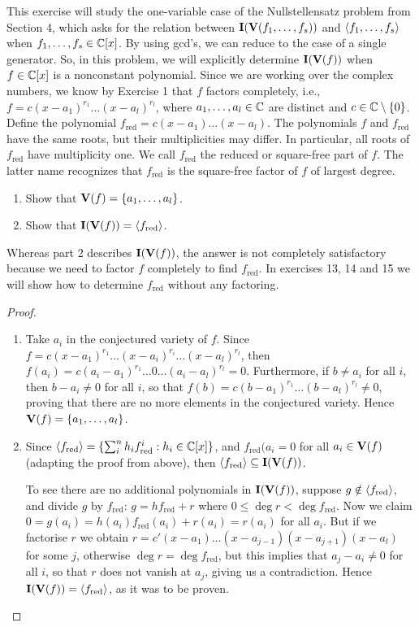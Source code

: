 \begin{exercise}{12}
This exercise will study the one-variable case of the Nullstellensatz problem from Section 4, which asks for the relation between $\mathbf{I}(\mathbf{V}(f_1,\dots,f_s))$ and $\langle f_1,\dots,f_s\rangle$ when $f_1,\dots,f_s\in\mathbb{C}[x]$. By using gcd's, we can reduce to the case of a single generator. So, in this problem, we will explicitly determine $\mathbf{I}(\mathbf{V}(f))$ when $f\in\mathbb{C}[x]$ is a nonconstant polynomial. Since we are working over the complex numbers, we know by Exercise 1 that $f$ factors completely, i.e., $f=c(x-a_1)^{r_1}\dots(x-a_l)^{r_l}$, where $a_1,\dots,a_l\in\mathbb{C}$ are distinct and $c\in\mathbb{C}\setminus\{0\}$. Define the polynomial $f_{\text{red}}=c(x-a_1)\dots(x-a_l)$. The polynomials $f$ and $f_{\text{red}}$ have the same roots, but their multiplicities may differ. In particular, all roots of $f_{\text{red}}$ have multiplicity one. We call $f_{\text{red}}$ the reduced or square-free part of $f$. The latter name recognizes that $f_{\text{red}}$ is the square-free factor of $f$ of largest degree.
\begin{enumerate}
    \item Show that $\mathbf{V}(f)=\{a_1,\dots,a_l\}$.
    \item Show that $\mathbf{I}(\mathbf{V}(f))=\langle f_{\text{red}}\rangle$.
\end{enumerate}
Whereas part 2 describes $\mathbf{I}(\mathbf{V}(f))$, the answer is not completely satisfactory because we need to factor $f$ completely to find $f_{\text{red}}$. In exercises 13, 14 and 15 we will show how to determine $f_{\text{red}}$ without any factoring.
\end{exercise}
\begin{proof}
\begin{enumerate}
    \item Take $a_i$ in the conjectured variety of $f$. Since $f=c(x-a_1)^{r_1}\dots(x-a_i)^{r_i}\dots(x-a_l)^{r_l}$, then $f(a_i)=c(a_i-a_1)^{r_1}\dots 0\dots(a_i-a_l)^{r_l}=0$. Furthermore, if $b\neq a_i$ for all $i$, then $b-a_i\neq 0$ for all $i$, so that $f(b)=c(b-a_1)^{r_1}\dots(b-a_l)^{r_l}\neq 0$, proving that there are no more elements in the conjectured variety. Hence $\mathbf{V}(f)=\{a_1,\dots,a_l\}$.
    \item Since $\langle f_{\text{red}}\rangle=\{\sum_i^nh_if_{\text{red}}^i: h_i\in\mathbb{C}[x]\}$, and $f_{\text{red}}(a_i=0$ for all $a_i\in\mathbf{V}(f)$ (adapting the proof from above), then $\langle f_{\text{red}}\rangle\subseteq\mathbf{I}(\mathbf{V}(f))$. 
    
    To see there are no additional polynomials in $\mathbf{I}(\mathbf{V}(f))$, suppose $g\notin\langle f_{\text{red}}\rangle$, and divide $g$ by $f_{\text{red}}$: $g=hf_{\text{red}}+r$ where $0\leq\deg r<\deg f_{\text{red}}$. Now we claim $0 =g(a_i) =h(a_i)f_{\text{red}}(a_i)+r(a_i) =r(a_i)$ for all $a_i$. But if we factorise $r$ we obtain $r=c'(x-a_1)\dots(x-a_{j-1})(x-a_{j+1})(x-a_l)$ for some $j$, otherwise $\deg r=\deg f_{\text{red}}$, but this implies that $a_j-a_i\neq 0$ for all $i$, so that $r$ does not vanish at $a_j$, giving us a contradiction. Hence $\mathbf{I}(\mathbf{V}(f))=\langle f_{\text{red}}\rangle$, as it was to be proven.
\end{enumerate}
\end{proof}

